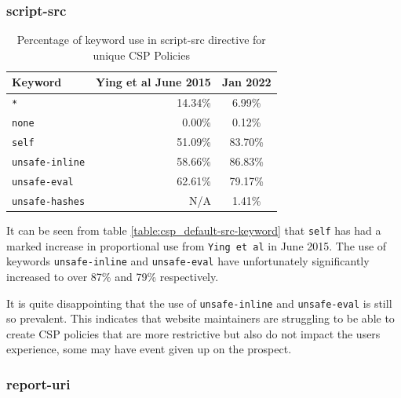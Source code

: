 \documentclass{mscreport}
\begin{document}
\subsubsection{script-src}

\begin{table}[H]
  \begin{center}
    \begin{tabular}{|l|D|c|}  %
      \hline
      \textbf{Keyword} & \textbf{Ying et al} \cite{Ying2016-ag} June 2015 & Jan 2022 \\
      \hline
      \texttt{*} & 14.34\% & 6.99\%\\
      \hline
      \texttt{none} & 0.00\% & 0.12\%\\
      \hline
      \texttt{self} & 51.09\% & 83.70\%\\
      \hline
      \texttt{unsafe-inline} & 58.66\% & 86.83\%\\
      \hline
      \texttt{unsafe-eval} & 62.61\% & 79.17\%\\
      \hline
      \texttt{unsafe-hashes} & N/A & 1.41\%\\
      \hline
    \end{tabular}
    \caption{Percentage of keyword use in script-src directive for unique CSP Policies}
    \label{table:csp_script-src-keyword}  %
  \end{center}
\end{table}

\noindent
It can be seen from table \ref{table:csp_default-src-keyword} that \texttt{self} has had a marked increase in proportional use from \texttt{Ying et al} \cite{Ying2016-ag} in June 2015. The use of keywords \texttt{unsafe-inline} and \texttt{unsafe-eval} have unfortunately significantly increased to over 87\% and 79\% respectively.

\vspace{0.3cm} \noindent
It is quite disappointing that the use of \texttt{unsafe-inline} and \texttt{unsafe-eval} is still so prevalent. This indicates that website maintainers are struggling to be able to create CSP policies that are more restrictive but also do not impact the users experience, some may have event given up on the prospect.

\subsubsection{report-uri}
\end{document}
